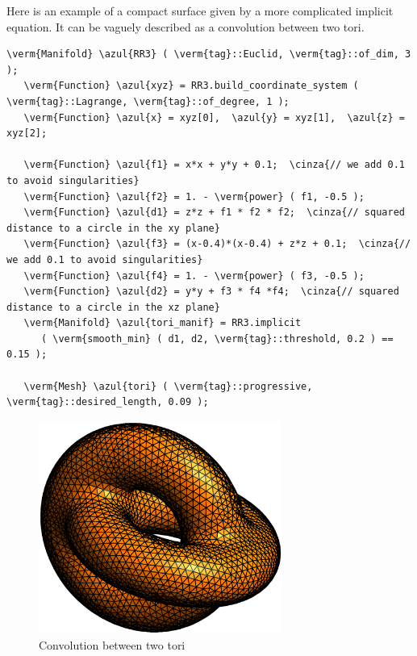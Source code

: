 Here is an example of a compact surface given by a more complicated implicit equation.
It can be vaguely described as a convolution between two tori.

\begin{Verbatim}[commandchars=\\\{\},formatcom=\small\tt,frame=single,
   label=parag-\ref{\numb section 3.\numb parag 7}.cpp,rulecolor=\color{coment},
   baselinestretch=0.94,framesep=2mm                                            ]
   \verm{Manifold} \azul{RR3} ( \verm{tag}::Euclid, \verm{tag}::of_dim, 3 );
   \verm{Function} \azul{xyz} = RR3.build_coordinate_system ( \verm{tag}::Lagrange, \verm{tag}::of_degree, 1 );
   \verm{Function} \azul{x} = xyz[0],  \azul{y} = xyz[1],  \azul{z} = xyz[2];

   \verm{Function} \azul{f1} = x*x + y*y + 0.1;  \cinza{// we add 0.1 to avoid singularities}
   \verm{Function} \azul{f2} = 1. - \verm{power} ( f1, -0.5 );
   \verm{Function} \azul{d1} = z*z + f1 * f2 * f2;  \cinza{// squared distance to a circle in the xy plane}
   \verm{Function} \azul{f3} = (x-0.4)*(x-0.4) + z*z + 0.1;  \cinza{// we add 0.1 to avoid singularities}
   \verm{Function} \azul{f4} = 1. - \verm{power} ( f3, -0.5 );
   \verm{Function} \azul{d2} = y*y + f3 * f4 *f4;  \cinza{// squared distance to a circle in the xz plane}
   \verm{Manifold} \azul{tori_manif} = RR3.implicit
      ( \verm{smooth_min} ( d1, d2, \verm{tag}::threshold, 0.2 ) == 0.15 );

   \verm{Mesh} \azul{tori} ( \verm{tag}::progressive, \verm{tag}::desired_length, 0.09 );
\end{Verbatim}

\begin{figure}[ht] \centering
 \includegraphics[width=80mm]{two-tori}
  \caption{Convolution between two tori}
\end{figure}

